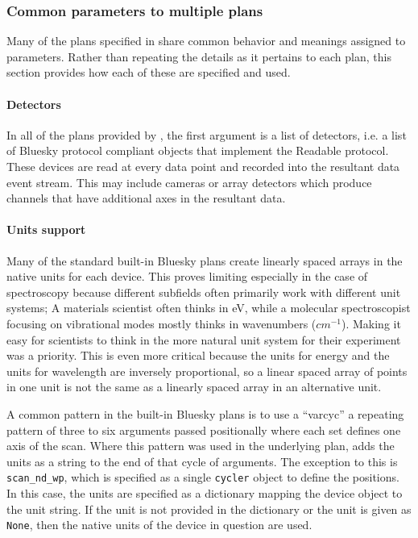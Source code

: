 \subsubsection{Common parameters to multiple plans}
\label{common_params}

Many of the plans specified in \wrightplans share common behavior and meanings assigned to parameters.
Rather than repeating the details as it pertains to each plan, this section provides how each of these are specified and used.

\paragraph{Detectors}

In all of the plans provided by \wrightplans, the first argument is a list of detectors, i.e. a list of Bluesky protocol compliant objects that implement the Readable protocol.
These devices are read at every data point and recorded into the resultant data event stream.
This may include cameras or array detectors which produce channels that have additional axes in the resultant data.

\paragraph{Units support}

Many of the standard built-in Bluesky plans create linearly spaced arrays in the native units for each device.
This proves limiting especially in the case of spectroscopy because different subfields often primarily work with different unit systems; A materials scientist often thinks in eV, while a molecular spectroscopist focusing on vibrational modes mostly thinks in wavenumbers ($cm^{-1}$).
Making it easy for scientists to think in the more natural unit system for their experiment was a priority.
This is even more critical because the units for energy and the units for wavelength are inversely proportional, so a linear spaced array of points in one unit is not the same as a linearly spaced array in an alternative unit.



A common pattern in the built-in Bluesky plans is to use a ``\gls{varcyc}'' a repeating pattern of three to six arguments passed positionally where each set defines one axis of the scan.
Where this pattern was used in the underlying plan, \wrightplans adds the units as a string to the end of that cycle of arguments.
The exception to this is \texttt{scan\_nd\_wp}, which is specified as a single \texttt{cycler}\cite{cycler} object to define the positions.
In this case, the units are specified as a dictionary mapping the device object to the unit string.
If the unit is not provided in the dictionary or the unit is given as \texttt{None}, then the native units of the device in question are used.

